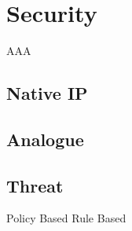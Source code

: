 \chapter{Security}
AAA
\section{Native IP}

\section{Analogue}

\section{Threat}



Policy Based
Rule Based
